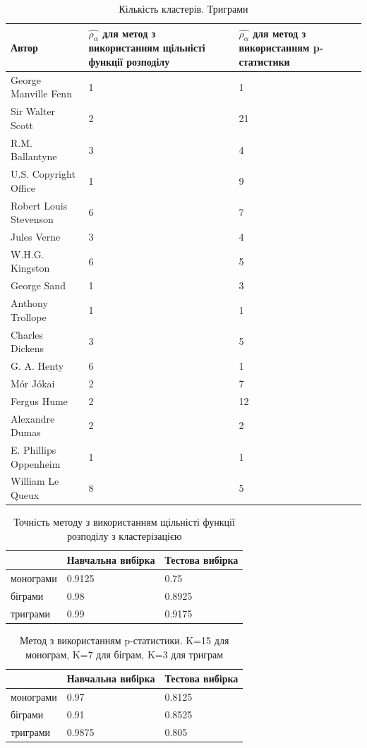 \documentclass[12pt, a4paper]{extarticle}
\begin{document}
\begin{center}
\begin{table}
\begin{tabular}{|p{11em}|p{10em}|p{10em}|}
\hline
Автор & $\hat{\rho_\alpha}$ для метод з використанням щільністі функції розподілу & $\hat{\rho_\alpha}$ для метод з використанням p-статистики\\
\hline
George Manville Fenn & 1 & 1\\
Sir Walter Scott & 2 & 21\\
R.M. Ballantyne & 3 & 4\\
U.S. Copyright Office & 1 & 9\\
Robert Louis Stevenson & 6 & 7\\
Jules Verne & 3 & 4\\
W.H.G. Kingston & 6 & 5\\
George Sand & 1 & 3\\
Anthony Trollope & 1 & 1\\
Charles Dickens & 3 & 5\\
G. A. Henty & 6 & 1\\
Mór Jókai & 2 & 7\\
Fergus Hume & 2 & 12\\
Alexandre Dumas & 2 & 2\\
E. Phillips Oppenheim & 1 & 1\\
William Le Queux & 8 & 5\\
\hline
\end{tabular}
\caption{Кількість кластерів. Триграми}
\label{tab:11}
\end{table}
\end{center}

\begin{center}
\begin{table}
\begin{tabular}{|p{5em}|p{10em}|p{10em}|}
\hline
& Навчальна вибірка & Тестова вибірка\\
\hline
монограми & 0.9125 & 0.75\\
біграми & 0.98 & 0.8925\\
триграми & 0.99 & 0.9175\\
\hline
\end{tabular}
\caption{Точність методу з використанням щільністі функції розподілу з кластерізацією}
\label{tab:12}
\end{table}
\end{center}

\begin{center}
\begin{table}
\begin{tabular}{|p{5em}|p{10em}|p{10em}|}
\hline
& Навчальна вибірка & Тестова вибірка\\
\hline
монограми & 0.97 & 0.8125\\
біграми & 0.91 & 0.8525\\
триграми & 0.9875 & 0.805\\
\hline
\end{tabular}
\caption{Метод з використанням p-статистики. K=15 для монограм, K=7 для біграм, K=3 для триграм}
\label{tab:13}
\end{table}
\end{center}
\end{document}
